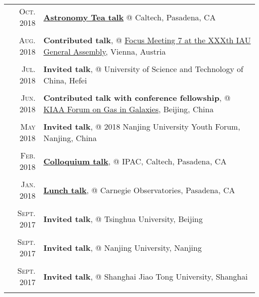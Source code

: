 \documentclass[letterpaper,12pt]{article}
\newcommand{\textwrap}{5.3in}       %
\begin{document}
\begin{longtable}{r|p{\textwrap}}
    \textsc{Oct. 2018}   &   \href{http://www.astro.caltech.edu/events/tea_talks/tea_2018_2019/abstracts/wang.txt}{\textbf{Astronomy Tea talk}} @ Caltech, Pasadena, CA \\
    \multicolumn{2}{c}{} \\

    \textsc{Aug. 2018}   &   \textbf{Contributed talk}, @ \href{http://www.arcetri.astro.it/fm7/programme.html}{Focus Meeting 7 at the XXXth IAU General Assembly}, Vienna, Austria \\
    \multicolumn{2}{c}{} \\

    \textsc{Jul. 2018}   &   \textbf{Invited talk}, @ University of Science and Technology of China, Hefei \\
    \multicolumn{2}{c}{} \\

    \textsc{Jun. 2018}   &   \textbf{Contributed talk with conference fellowship}, @ \href{http://kiaa.pku.edu.cn/gasingalaxies/?q=program}{KIAA Forum on Gas in Galaxies}, Beijing, China \\
    \multicolumn{2}{c}{} \\

    \textsc{May 2018}   &   \textbf{Invited talk}, @ 2018 Nanjing University Youth Forum, Nanjing, China \\
    \multicolumn{2}{c}{} \\

    \textsc{Feb. 2018}   &   \href{https://www.ipac.caltech.edu/event/358}{\textbf{Colloquium talk}}, @ IPAC, Caltech, Pasadena, CA \\
    \multicolumn{2}{c}{} \\

    \textsc{Jan. 2018}   &   \href{http://obs.carnegiescience.edu/talk_event/828}{\textbf{Lunch talk}}, @ Carnegie Observatories, Pasadena, CA \\
    \multicolumn{2}{c}{} \\

    \textsc{Sept. 2017}   &   \textbf{Invited talk}, @ Tsinghua University, Beijing \\
    \multicolumn{2}{c}{} \\

    \textsc{Sept. 2017}   &   \textbf{Invited talk}, @ Nanjing University, Nanjing \\
    \multicolumn{2}{c}{} \\

    \textsc{Sept. 2017}   &   \textbf{Invited talk}, @ Shanghai Jiao Tong University, Shanghai \\
    \multicolumn{2}{c}{} \\


\end{longtable}
\end{document}
